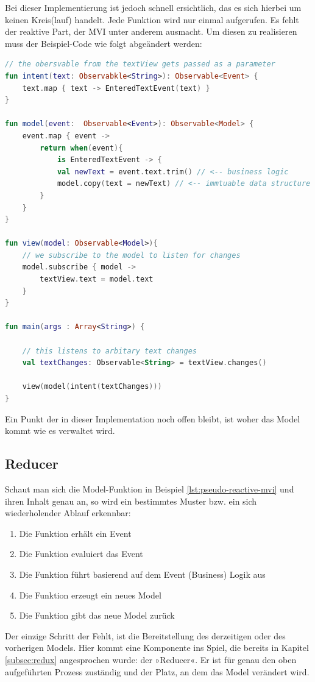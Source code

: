 Bei dieser Implementierung ist jedoch schnell ersichtlich, das es sich hierbei um keinen Kreis(lauf) handelt. Jede Funktion wird nur einmal aufgerufen. Es fehlt der reaktive Part, der MVI unter anderem ausmacht. Um diesen zu realisieren muss der Beispiel-Code wie folgt abgeändert werden:
\begin{lstlisting}[caption={pseudo mvi implementation},label={lst:pseudo-reactive-mvi},language=Kotlin]
// the obersvable from the textView gets passed as a parameter
fun intent(text: Observabkle<String>): Observable<Event> {
	text.map { text -> EnteredTextEvent(text) }
}

fun model(event:  Observable<Event>): Observable<Model> {
	event.map { event ->
		return when(event){
			is EnteredTextEvent -> {
			val newText = event.text.trim() // <-- business logic
			model.copy(text = newText) // <-- immtuable data structure
		}
	}	
}

fun view(model: Observable<Model>){
	// we subscribe to the model to listen for changes
	model.subscribe { model ->
		textView.text = model.text 	
	}	
}

fun main(args : Array<String>) {

	// this listens to arbitary text changes 
	val textChanges: Observable<String> = textView.changes()

	view(model(intent(textChanges))) 
}
\end{lstlisting}
Ein Punkt der in dieser Implementation noch offen bleibt, ist woher das Model kommt wie es verwaltet wird.

\subsection{Reducer}
Schaut man sich die Model-Funktion in Beispiel \ref{lst:pseudo-reactive-mvi} und ihren Inhalt genau an, so wird ein bestimmtes Muster bzw. ein sich wiederholender Ablauf erkennbar:
\\
\begin{enumerate}
	\item Die Funktion erhält ein Event 
	\item Die Funktion evaluiert das Event
	\item Die Funktion führt basierend auf dem Event (Business) Logik aus
	\item Die Funktion erzeugt ein neues Model
	\item Die Funktion gibt das neue Model zurück
\end{enumerate}
Der einzige Schritt der Fehlt, ist die Bereitstellung des derzeitigen oder des vorherigen Models. Hier kommt eine Komponente ins Spiel, die bereits in Kapitel
\ref{subsec:redux} 
angesprochen wurde: der »Reducer«. Er ist für genau den oben aufgeführten Prozess zuständig und der Platz, an dem das Model verändert wird.

